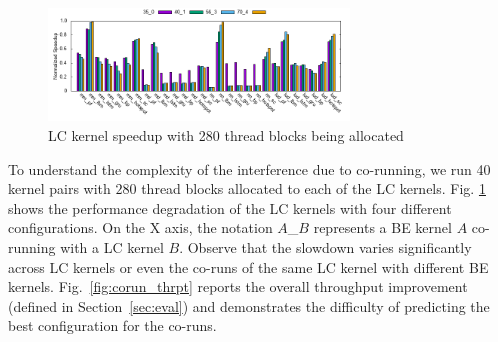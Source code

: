 	\begin{figure}%
	\vspace{-0.5cm}
		\centering
		\includegraphics[width=\textwidth,height=3cm]{figures/mot_qperf.png}
		\caption{LC kernel speedup with 280 thread blocks being allocated}
		\label{fig:corun_perf}
		\vspace{-0.5cm}
	\end{figure}
To understand the complexity of the interference due to co-running, we run 40 kernel pairs with $280$ thread blocks allocated to each of the LC kernels. Fig. \ref{fig:corun_perf} shows the performance degradation of the LC kernels with four different configurations. On the X axis, the notation $A$\_$B$ represents a BE kernel $A$ co-running with a LC kernel $B$. Observe that the slowdown varies significantly across LC kernels or even the co-runs of the same LC kernel with different BE kernels. Fig.~\ref{fig:corun_thrpt} reports the overall throughput improvement (defined in Section~\ref{sec:eval}) and demonstrates the difficulty of predicting the best configuration for the co-runs.

